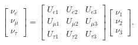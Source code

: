 \begin{equation}\label{eq:PMNS Matrix U Form}
\begin{bmatrix}
\nu_{e} \\
\nu_{\mu} \\
\nu_{\tau}
\end{bmatrix}
=
  \begin{bmatrix}
    U_{e1} & U_{e2} & U_{e3} \\
    U_{\mu1} & U_{\mu2} & U_{\mu3} \\
    U_{\tau1} & U_{\tau2} & U_{\tau3}
  \end{bmatrix}
  \begin{bmatrix}
  	\nu_{1} \\
	\nu_{2} \\
	\nu_{3}
  \end{bmatrix}.
  \end{equation}

